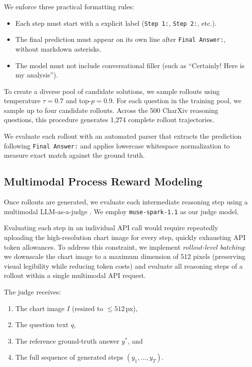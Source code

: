 \documentclass[11pt]{article}
\begin{document}
We enforce three practical formatting rules:
\begin{itemize}[noitemsep,topsep=0pt]
    \item Each step must start with a explicit label (\texttt{Step 1:}, \texttt{Step 2:}, etc.).
    \item The final prediction must appear on its own line after \texttt{Final Answer:}, without markdown asterisks.
    \item The model must not include conversational filler (such as ``Certainly! Here is my analysis'').
\end{itemize}

To create a diverse pool of candidate solutions, we sample rollouts using temperature $\tau = 0.7$ and top-$p = 0.9$. For each question in the training pool, we sample up to four candidate rollouts. Across the 500 CharXiv \citep{wang2024charxiv} reasoning questions, this procedure generates 1,274 complete rollout trajectories.

We evaluate each rollout with an automated parser that extracts the prediction following \texttt{Final Answer:} and applies lowercase whitespace normalization to measure exact match against the ground truth.

\subsection{Multimodal Process Reward Modeling}
\label{subsec:prm_judge}
Once rollouts are generated, we evaluate each intermediate reasoning step using a multimodal LLM-as-a-judge \citep{zheng2023judging}. We employ \texttt{muse-spark-1.1} \citep{meta2026musespark} as our judge model. 

Evaluating each step in an individual API call would require repeatedly uploading the high-resolution chart image for every step, quickly exhausting API token allowances. To address this constraint, we implement \textit{rollout-level batching}: we downscale the chart image to a maximum dimension of 512 pixels (preserving visual legibility while reducing token costs) and evaluate all reasoning steps of a rollout within a single multimodal API request.

The judge receives:
\begin{enumerate}[noitemsep,topsep=0pt]
    \item The chart image $I$ (resized to $\le 512$\,px),
    \item The question text $q$,
    \item The reference ground-truth answer $y^*$, and
    \item The full sequence of generated steps $(y_1, \dots, y_T)$.
\end{enumerate}
\end{document}
